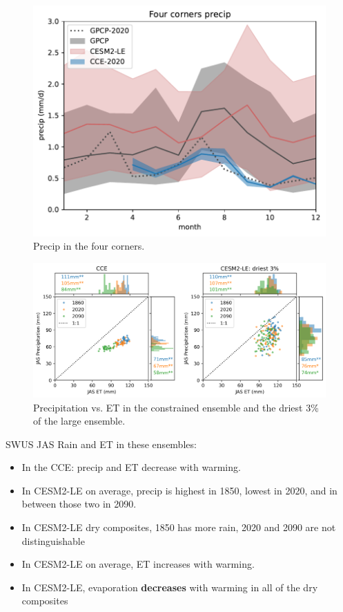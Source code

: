 \documentclass[11pt]{article}
\begin{document}
\begin{figure}[h]
\centering
\includegraphics[width=40pc]{figs/main/precip.pdf}
\caption{Precip in the four corners.}
\label{fig:precip}
\end{figure}


\newpage
\begin{figure}[h]
\centering
\includegraphics[width=40pc]{figs/main/scatter_ET_P.png}
\caption{Precipitation vs. ET in the constrained ensemble and the driest 3\% of the large ensemble.}
\label{fig:precip}
\end{figure}



SWUS JAS Rain and ET in these ensembles:
\begin{itemize}
    \item In the CCE: precip and ET decrease with warming.
    \item In CESM2-LE on average, precip is highest in 1850, lowest in 2020, and in between those two in 2090.
    \item In CESM2-LE dry composites, 1850 has more rain, 2020 and 2090 are not distinguishable
    \item In CESM2-LE on average, ET increases with warming.
    \item In CESM2-LE, evaporation \textbf{decreases} with warming in all of the dry composites    
\end{itemize}
\end{document}
